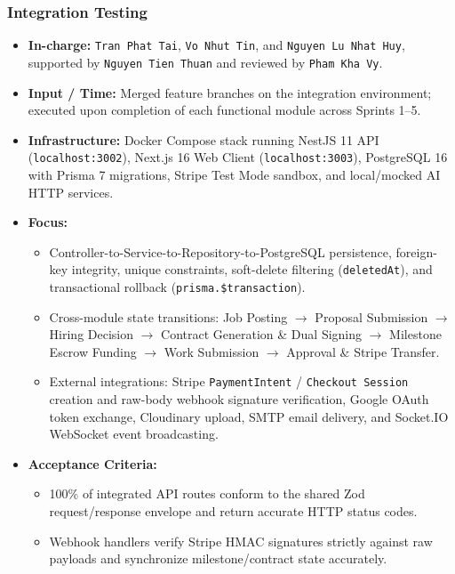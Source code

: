\documentclass[12pt,a4paper]{article}
\begin{document}
\subsubsection{Integration Testing}
\begin{itemize}
  \item {\sloppy \textbf{In-charge:} \texttt{Tran Phat Tai}, \texttt{Vo Nhut Tin}, and \texttt{Nguyen Lu Nhat Huy}, supported by \texttt{Nguyen Tien Thuan} and reviewed by \texttt{Pham Kha Vy}.\par}
  \item \textbf{Input / Time:} Merged feature branches on the integration environment; executed upon completion of each functional module across Sprints 1--5.
  \item \textbf{Infrastructure:} Docker Compose stack running NestJS 11 API (\texttt{localhost:3002}), Next.js 16 Web Client (\texttt{localhost:3003}), PostgreSQL 16 with Prisma 7 migrations, Stripe Test Mode sandbox, and local/mocked AI HTTP services.
  \item \textbf{Focus:}
  \begin{itemize}
    \item {\sloppy Controller-\allowbreak{}to-\allowbreak{}Service-\allowbreak{}to-\allowbreak{}Repository-\allowbreak{}to-\allowbreak{}PostgreSQL persistence, foreign-key integrity, unique constraints, soft-delete filtering (\texttt{deletedAt}), and transactional rollback (\texttt{prisma.\allowbreak\$transaction}).\par}
    \item Cross-module state transitions: Job Posting $\rightarrow$ Proposal Submission $\rightarrow$ Hiring Decision $\rightarrow$ Contract Generation \& Dual Signing $\rightarrow$ Milestone Escrow Funding $\rightarrow$ Work Submission $\rightarrow$ Approval \& Stripe Transfer.
    \item External integrations: Stripe \texttt{PaymentIntent} / \texttt{Checkout Session} creation and raw-body webhook signature verification, Google OAuth token exchange, Cloudinary upload, SMTP email delivery, and Socket.IO WebSocket event broadcasting.
  \end{itemize}
  \item \textbf{Acceptance Criteria:}
  \begin{itemize}
    \item 100\% of integrated API routes conform to the shared Zod request/response envelope and return accurate HTTP status codes.
    \item Webhook handlers verify Stripe HMAC signatures strictly against raw payloads and synchronize milestone/contract state accurately.
  \end{itemize}
\end{itemize}
\end{document}
